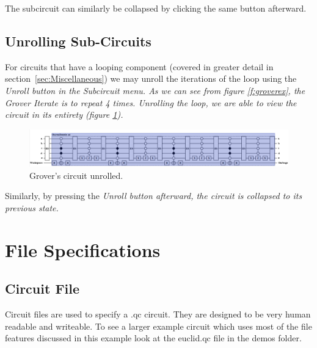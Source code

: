 \documentclass[10pt]{article}
\theoremstyle{definition}
\begin{document}
The subcircuit can similarly be collapsed by clicking the same button afterward.


\subsection{Unrolling Sub-Circuits}\label{sec:UnrollingSubCircuits}

For circuits that have a looping component (covered in greater detail in section~\ref{sec:Miscellaneous}) we may unroll the iterations of the loop using the \em Unroll \em button in the \em Subcircuit \em menu. As we can see from figure \ref{f:groverex}, the Grover Iterate is to repeat 4 times. Unrolling the loop, we are able to view the circuit in its entirety (figure \ref{f:groverunroll}).

\begin{figure}
\capstart
\centering
\includegraphics[width=170mm]{Figures/SubCircuits/GroverCircuitUnroll}
\caption{Grover's circuit unrolled.}
\label{f:groverunroll}
\end{figure}

Similarly, by pressing the \em Unroll \em button afterward, the circuit is collapsed to its previous state. 

\section{File Specifications}

\subsection{Circuit File}
Circuit files are used to specify a .qc circuit. They are designed to be very human readable and
writeable.  To see a larger example circuit which uses most of the file features discussed in this example
look at the euclid.qc file in the demos folder.
\end{document}
